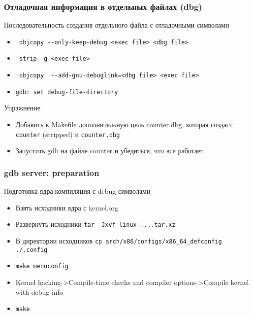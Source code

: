 \begin{frame}[fragile]
  \frametitle{Отладочная информация в отдельных файлах (dbg)}
  \begin{center}
    Последовательность создания отдельного файла с отладочными символами
  \end{center}
  \begin{itemize}
    \item \verb+ objcopy --only-keep-debug <exec file> <dbg file>+
    \item \verb+ strip -g <exec file>+
    \item \verb+ objcopy  --add-gnu-debuglink=<dbg file> <exec file> + 
    \item \texttt{gdb: set debug-file-directory}
  \end{itemize} 
\pause
  \begin{center}
   Упражнение
  \end{center}
  \begin{itemize}
    \item Добавить к Makefile дополнительную цель counter.dbg, которая создаст \texttt{counter} (stripped) и \texttt{counter.dbg}
    \item Запустить gdb на файле counter и убедиться, что все работает
  \end{itemize}
\end{frame}  

\begin{frame}
  \frametitle{gdb server: preparation}
  \begin{center}
    {\large Подготовка ядра:компиляция с debug символами}
  \end{center}
  \begin{itemize}
    \item Взять исходники ядра с kernel.org
    \item Развернуть исходники \texttt{tar -Jxvf linux-....tar.xz}
    \item В директории исходников \texttt{cp arch/x86/configs/x86\_64\_defconfig ./.config}
    \item \texttt{make menuconfig}
    \item Kernel hacking->Compile-time checks and compiler options->Compile kernel with debug info
    \item \texttt{make}
  \end{itemize}
\end{frame}

